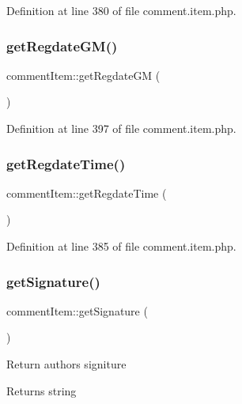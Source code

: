 Definition at line 380 of file comment.\+item.\+php.

\hypertarget{classcommentItem_ae5f0203691b6d16a2d99ae40d67adb3f}{}\label{classcommentItem_ae5f0203691b6d16a2d99ae40d67adb3f} 
\subsubsection{\texorpdfstring{get\+Regdate\+G\+M()}{getRegdateGM()}}
{\footnotesize\ttfamily comment\+Item\+::get\+Regdate\+GM (\begin{DoxyParamCaption}{ }\end{DoxyParamCaption})}



Definition at line 397 of file comment.\+item.\+php.

\hypertarget{classcommentItem_adb5754f10a245c54a0beb4f6fb22f0e3}{}\label{classcommentItem_adb5754f10a245c54a0beb4f6fb22f0e3} 
\subsubsection{\texorpdfstring{get\+Regdate\+Time()}{getRegdateTime()}}
{\footnotesize\ttfamily comment\+Item\+::get\+Regdate\+Time (\begin{DoxyParamCaption}{ }\end{DoxyParamCaption})}



Definition at line 385 of file comment.\+item.\+php.

\hypertarget{classcommentItem_a97eea3e5359c0ffe84db781d5e5fbff6}{}\label{classcommentItem_a97eea3e5359c0ffe84db781d5e5fbff6} 
\subsubsection{\texorpdfstring{get\+Signature()}{getSignature()}}
{\footnotesize\ttfamily comment\+Item\+::get\+Signature (\begin{DoxyParamCaption}{ }\end{DoxyParamCaption})}

Return author\textquotesingle{}s signiture \begin{DoxyReturn}{Returns}
string 
\end{DoxyReturn}


